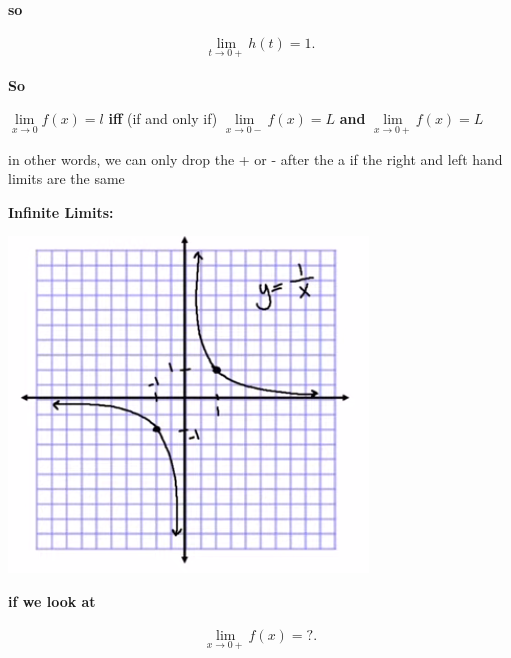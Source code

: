 \documentclass{report}
\begin{document}
    \bigbreak \noindent 
    \textbf{so}

    \begin{align*}
        \lim\limits_{t \to 0+ }{h \left(t\right) = 1}
    .\end{align*}

    \bigbreak \noindent 

    \bigbreak \noindent 
    \textbf{So}

    \bigbreak \noindent 
    $\lim\limits_{x \to 0}{f \left(x\right) = l}$ \textbf{iff} (if and only if) $\lim\limits_{x \to 0- }{f \left(x\right) = L}$ \textbf{and} $\lim\limits_{x \to 0+ }{f \left(x\right) = L}$

    \bigbreak \noindent 
    in other words, we can only drop the + or - after the a if the right and left hand limits are the same

    \pagebreak
    \begin{large}
       \noindent \textbf{Infinite Limits:} 
    \end{large}
    
    \bigbreak \noindent \bigbreak 
    \begin{center}
        \includegraphics[scale=0.7]{../images/graph.png}
    \end{center}
    
    \bigbreak \noindent 
    \textbf{if we look at }

    \begin{large}
        \begin{align*}
            \lim\limits_{x \to 0+}{f(x) = ?}
        .\end{align*}
    \end{large}
    
\end{document}
